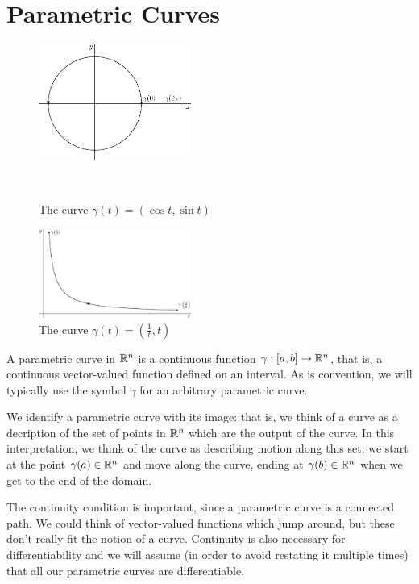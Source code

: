\documentclass[fleqn,letterpaper]{report}
\begin{document}
\section{Parametric Curves}
\label{parametric-curves-definition}

\begin{figure}[t]
\centering
\includegraphics[width=5cm]{figure10.eps}
\caption{The curve $\gamma(t) = (\cos t, \sin t)$}\
\label{figure-parametric-curve1}
\end{figure}

\begin{figure}[t]
\centering
\includegraphics[width=5cm]{figure11.eps}
\caption{The curve $\gamma(t) = \left( \frac{1}{t} , t
\right)$}
\label{figure-parametric-curve2}
\end{figure}

\begin{defn}
A parametric curve in $\mathbb{R}^n$ is a continuous function $\gamma
:[a,b] \rightarrow \mathbb{R}^n$, that is, a continuous vector-valued
function defined on an interval. As is convention, we will
typically use the symbol $\gamma$ for an arbitrary parametric
curve.
\end{defn} 

We identify a parametric curve with its image: that is, we think
of a curve as a decription of the set of points in $\mathbb{R}^n$ which
are the output of the curve. In this interpretation, we think
of the curve as describing motion along this set: we start at
the point $\gamma(a) \in \mathbb{R}^n$ and move along the curve, ending
at $\gamma(b) \in \mathbb{R}^n$ when we get to the end of the domain.

The continuity condition is important, since a parametric
curve is a connected path. We could think of vector-valued
functions which jump around, but these don't really fit the
notion of a curve. Continuity is also necessary for
differentiability and we will assume (in order to avoid
restating it multiple times) that all our parametric curves
are differentiable.
\end{document}

